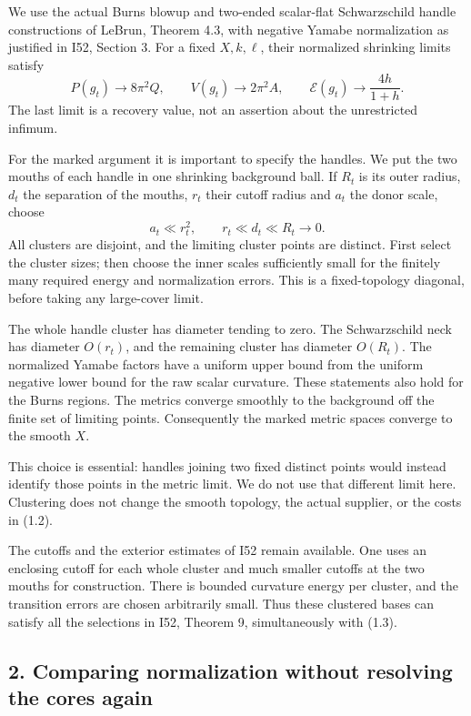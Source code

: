 \documentclass[
  11pt,
]{article}
\begin{document}
We use the actual Burns blowup and two-ended scalar-flat Schwarzschild
handle constructions of LeBrun, Theorem 4.3, with negative Yamabe
normalization as justified in I52, Section 3. For a fixed \(X,k,\ell\),
their normalized shrinking limits satisfy \[
 P(g_t)\longrightarrow8\pi^2Q,\qquad
 V(g_t)\longrightarrow2\pi^2A,\qquad
 \mathcal E(g_t)\longrightarrow\frac{4h}{1+h}.         \tag{1.2}
\] The last limit is a recovery value, not an assertion about the
unrestricted infimum.

For the marked argument it is important to specify the handles. We put
the two mouths of each handle in one shrinking background ball. If
\(R_t\) is its outer radius, \(d_t\) the separation of the mouths,
\(r_t\) their cutoff radius and \(a_t\) the donor scale, choose \[
 a_t\ll r_t^2,\qquad r_t\ll d_t\ll R_t\longrightarrow0. \tag{1.3}
\] All clusters are disjoint, and the limiting cluster points are
distinct. First select the cluster sizes; then choose the inner scales
sufficiently small for the finitely many required energy and
normalization errors. This is a fixed-topology diagonal, before taking
any large-cover limit.

The whole handle cluster has diameter tending to zero. The Schwarzschild
neck has diameter \(O(r_t)\), and the remaining cluster has diameter
\(O(R_t)\). The normalized Yamabe factors have a uniform upper bound
from the uniform negative lower bound for the raw scalar curvature.
These statements also hold for the Burns regions. The metrics converge
smoothly to the background off the finite set of limiting points.
Consequently the marked metric spaces converge to the smooth \(X\).

This choice is essential: handles joining two fixed distinct points
would instead identify those points in the metric limit. We do not use
that different limit here. Clustering does not change the smooth
topology, the actual supplier, or the costs in (1.2).

The cutoffs and the exterior estimates of I52 remain available. One uses
an enclosing cutoff for each whole cluster and much smaller cutoffs at
the two mouths for construction. There is bounded curvature energy per
cluster, and the transition errors are chosen arbitrarily small. Thus
these clustered bases can satisfy all the selections in I52, Theorem 9,
simultaneously with (1.3).

\hypertarget{comparing-normalization-without-resolving-the-cores-again}{%
\subsection{2. Comparing normalization without resolving the cores
again}\label{comparing-normalization-without-resolving-the-cores-again}}
\end{document}

